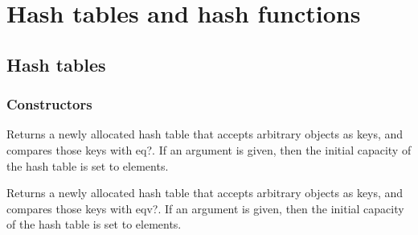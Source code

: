 \documentclass[twoside]{algol60}
\begin{document}
\chapter{Hash tables and hash functions}


\section{Hash tables}

\subsection{Constructors}


\begin{entry}{%
}

Returns a newly allocated hash table that accepts arbitrary objects as keys, 
and compares those keys with {\cf eq?}. If an argument is given, then the initial 
capacity of the hash table is set to  elements.

\end{entry}

\begin{entry}{%
}

Returns a newly allocated hash table that accepts arbitrary objects as keys, 
and compares those keys with {\cf eqv?}.
If an argument is given, then the initial 
capacity of the hash table is set to  elements.

\end{entry}
\end{document}
